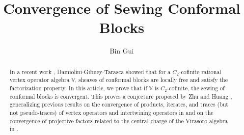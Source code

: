 \documentclass[12pt,a4paper,notitlepage]{article}
\title{Convergence of Sewing Conformal Blocks}
\author{{\sc Bin Gui}
}
\date{}
\theoremstyle{definition}
\theoremstyle{plain}
\newcommand{\Vbb}{\mathbb V}
\numberwithin{equation}{section}
\begin{document}
\sloppy %



	\maketitle









\tableofcontents


	











\newpage


\begin{abstract}
In a recent work \cite{DGT19b}, Damiolini-Gibney-Tarasca showed that for a $C_2$-cofinite rational vertex operator algebra $\Vbb$, sheaves of conformal blocks are locally free and satisfy the factorization property. In this article, we  prove that if $\Vbb$ is $C_2$-cofinite, the sewing of conformal blocks is convergent. This proves a conjecture proposed by Zhu \cite{Zhu94} and Huang \cite{Hua16}, generalizing previous results on the convergence of products, iterates, and traces (but not pseudo-traces) of vertex operators and intertwining operators in \cite{Zhu96,Hua95,Hua05b,HLZ11} and on the convergence of projective factors related to the central charge of the Virasoro algebra in \cite{Hua97}.
\end{abstract}
\end{document}
